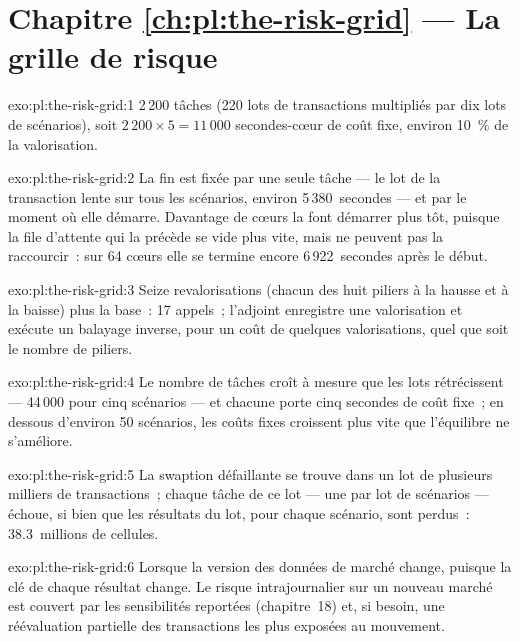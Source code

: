 \section*{Chapitre \ref{ch:pl:the-risk-grid} --- La grille de risque}

\begin{solution}{exo:pl:the-risk-grid:1}
2\,200 tâches (220 lots de transactions multipliés par dix lots de scénarios), soit $2\,200 \times 5 = 11\,000$ secondes-cœur de coût fixe, environ 10~\% de la
valorisation.
\end{solution}

\begin{solution}{exo:pl:the-risk-grid:2}
La fin est fixée par une seule tâche --- le lot de la transaction lente sur tous les scénarios, environ 5\,380~secondes --- et par le moment où elle démarre. Davantage de cœurs
la font démarrer plus tôt, puisque la file d'attente qui la précède se vide plus vite, mais ne peuvent pas la raccourcir~: sur 64 cœurs elle se termine encore 6\,922~secondes après le
début.
\end{solution}

\begin{solution}{exo:pl:the-risk-grid:3}
Seize revalorisations (chacun des huit piliers à la hausse et à la baisse) plus la base~: 17 appels~; l'adjoint enregistre une valorisation et exécute un balayage inverse,
pour un coût de quelques valorisations, quel que soit le nombre de piliers.
\end{solution}

\begin{solution}{exo:pl:the-risk-grid:4}
Le nombre de tâches croît à mesure que les lots rétrécissent --- 44\,000 pour cinq scénarios --- et chacune porte cinq secondes de coût fixe~; en dessous
d'environ 50 scénarios, les coûts fixes croissent plus vite que l'équilibre ne s'améliore.
\end{solution}

\begin{solution}{exo:pl:the-risk-grid:5}
La swaption défaillante se trouve dans un lot de plusieurs milliers de transactions~; chaque tâche de ce lot --- une par lot de scénarios --- échoue, si bien que les
résultats du lot, pour chaque scénario, sont perdus~: 38.3~millions de cellules.
\end{solution}

\begin{solution}{exo:pl:the-risk-grid:6}
Lorsque la version des données de marché change, puisque la clé de chaque résultat change. Le risque intrajournalier sur un nouveau marché est couvert par les sensibilités
reportées (chapitre~18) et, si besoin, une réévaluation partielle des transactions les plus exposées au mouvement.
\end{solution}


